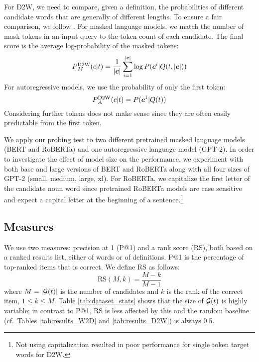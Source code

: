 \documentclass[11pt,a4paper]{article}
\def\uprm#1#2{\mbox{$_#2^{\hbox{\scriptsize #1}}$}}
\begin{document}
For D2W, we need to compare, given a definition, the probabilities of
different candidate words that are generally of different lengths.
To ensure a fair comparison,
we follow
. For masked language models, we
match the number of mask tokens in an input query to the
token count of each candidate. The final score is the average log-probability of the masked tokens:
\begin{equation*}
    P\uprm{D2W}{M}(c|t) =
    \frac{1}{|\bm{c}|}\sum_{i=1}^{|\bm{c}|}\log P(\bm{c}^i |
    Q(t,|\bm{c}|))
\end{equation*}
For autoregressive models, we use the probability of only
the first token:
\begin{equation*}
    P\uprm{D2W}{A}(c|t) =
     P(\bm{c}^1 |
    Q(t))
\end{equation*}
Considering further tokens does not make sense since they
are often easily predictable from the first token.


We apply our probing test to two different pretrained
masked language models (BERT and
RoBERTa) and one autoregressive language model
(GPT-2). 
In order to investigate the effect of model
size on the performance, we experiment with both
base and large versions of BERT and RoBERTa
along with all four sizes of GPT-2 (small, medium,
large, xl). 
For RoBERTa, we capitalize the first letter of the candidate
noun word since pretrained RoBERTa models are case sensitive
and expect a capital letter at the beginning of a
sentence.\footnote{Not using capitalization  resulted in
  poor performance for single token target words for D2W.}

\subsection{Measures}
We use two measures: precision at 1 (P@1) and a rank score
(RS), both based on a ranked results list, either of words
or of definitions. P@1 is the percentage of top-ranked items
that is correct.
We define RS as follows:  
\begin{equation*}
    \text{RS}(M,k) = \frac{M-k}{M-1}
\end{equation*}
where $M=|{\cal G}(t)|$ is the number of candidates  and
$k$ is the rank of the correct item, $1 \leq k \leq M$.
Table \ref{tab:dataset_stats} shows that the size of ${\cal G}(t)$
is highly variable;
in contrast to P@1, RS is less affected by
this and the random baseline (cf.\ Tables
\ref{tab:results_W2D}
and \ref{tab:results_D2W}) is always 0.5.  
\end{document}
